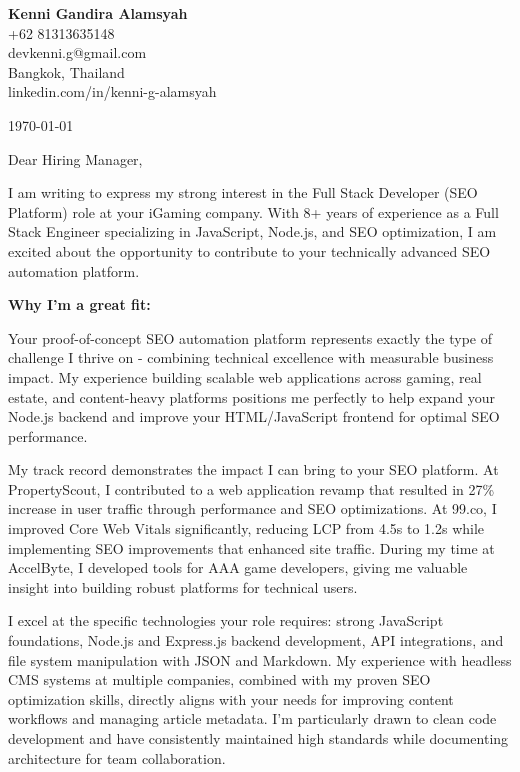 \documentclass[12pt]{article}
\begin{document}
\begin{flushleft}

\textbf{Kenni Gandira Alamsyah} \\
+62 81313635148 \\
devkenni.g@gmail.com \\
Bangkok, Thailand \\
linkedin.com/in/kenni-g-alamsyah

\vspace{1cm}

\today

\vspace{1cm}

Dear Hiring Manager,

\vspace{0.5cm}

I am writing to express my strong interest in the Full Stack Developer (SEO Platform) role at your iGaming company. With 8+ years of experience as a Full Stack Engineer specializing in JavaScript, Node.js, and SEO optimization, I am excited about the opportunity to contribute to your technically advanced SEO automation platform.

\textbf{Why I'm a great fit:}

Your proof-of-concept SEO automation platform represents exactly the type of challenge I thrive on - combining technical excellence with measurable business impact. My experience building scalable web applications across gaming, real estate, and content-heavy platforms positions me perfectly to help expand your Node.js backend and improve your HTML/JavaScript frontend for optimal SEO performance.

My track record demonstrates the impact I can bring to your SEO platform. At PropertyScout, I contributed to a web application revamp that resulted in 27\% increase in user traffic through performance and SEO optimizations. At 99.co, I improved Core Web Vitals significantly, reducing LCP from 4.5s to 1.2s while implementing SEO improvements that enhanced site traffic. During my time at AccelByte, I developed tools for AAA game developers, giving me valuable insight into building robust platforms for technical users.

I excel at the specific technologies your role requires: strong JavaScript foundations, Node.js and Express.js backend development, API integrations, and file system manipulation with JSON and Markdown. My experience with headless CMS systems at multiple companies, combined with my proven SEO optimization skills, directly aligns with your needs for improving content workflows and managing article metadata. I'm particularly drawn to clean code development and have consistently maintained high standards while documenting architecture for team collaboration.


\end{flushleft}
\end{document}
